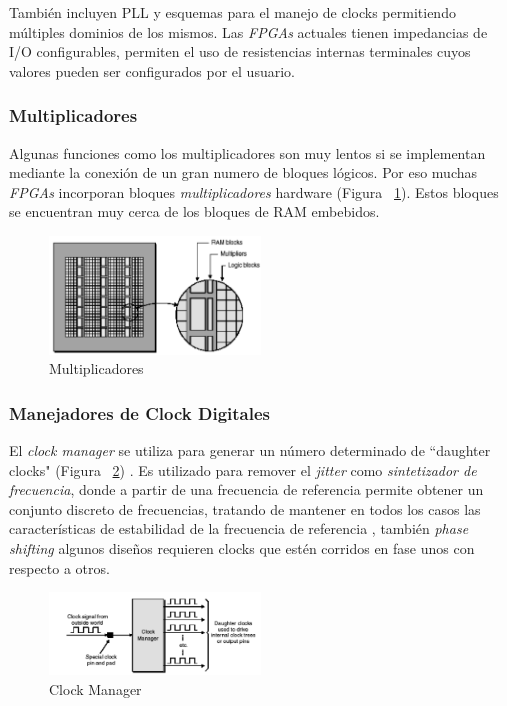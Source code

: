 		También incluyen PLL y esquemas para el manejo de clocks permitiendo múltiples dominios de los mismos. Las \textit{FPGAs} actuales tienen
		impedancias de I/O configurables, permiten el uso de resistencias internas terminales cuyos valores pueden ser configurados por el usuario.

		\subsubsection{Multiplicadores}
		Algunas funciones como los multiplicadores son muy lentos si se implementan mediante la conexión de un gran numero de bloques lógicos. Por eso
		muchas \textit{FPGAs} incorporan bloques \textit{multiplicadores} hardware (Figura ~\ref{fig:mult}). Estos bloques se encuentran muy cerca de los
		bloques de RAM embebidos.
		
		\begin{figure}[h!]
 		\begin{center}
 		\includegraphics[width=0.5\textwidth,keepaspectratio=true]{./images/multram}
  		\caption{Multiplicadores}
  		\label{fig:mult}
 		\end{center}
		\end{figure}

		\subsubsection{Manejadores de Clock Digitales}
		El \textit{clock manager} se utiliza para generar un número determinado de “daughter clocks" (Figura ~\ref{fig:dclocks}) . Es utilizado para
		remover el \textit{jitter} como \textit{sintetizador de frecuencia}, donde a partir de una frecuencia de referencia permite obtener un conjunto
		discreto de frecuencias, tratando de mantener en todos los casos las características de estabilidad de la frecuencia de referencia
		\cite{Etiqueta03}, también \textit{phase shifting} algunos diseños requieren clocks que estén corridos en fase unos con respecto a otros.

		\begin{figure}[h!]
 		\begin{center}
 		\includegraphics[width=0.5\textwidth,keepaspectratio=true]{./images/dougther}
  		\caption{Clock Manager}
  		\label{fig:dclocks}
 		\end{center}
		\end{figure}


